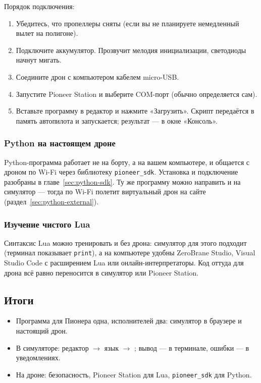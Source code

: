 Порядок подключения:
\begin{enumerate}
    \item Убедитесь, что пропеллеры сняты (если вы не планируете немедленный вылет на полигоне).
    \item Подключите аккумулятор. Прозвучит мелодия инициализации, светодиоды начнут мигать.
    \item Соедините дрон с компьютером кабелем micro-USB.
    \item Запустите Pioneer Station и выберите COM-порт (обычно определяется сам).
    \item Вставьте программу в редактор и нажмите «Загрузить». Скрипт передаётся в память автопилота и запускается; результат --- в окне «Консоль».
\end{enumerate}

\subsubsection{Python на настоящем дроне}

Python-программа работает не на борту, а на вашем компьютере, и общается с дроном по Wi-Fi через библиотеку \texttt{pioneer\_sdk}. Установка и подключение разобраны в главе~\ref{sec:python-sdk}. Ту же программу можно направить и на симулятор --- тогда по Wi-Fi полетит виртуальный дрон на сайте (раздел~\ref{sec:python-external}).

\subsubsection{Изучение чистого Lua}

Синтаксис Lua можно тренировать и без дрона: симулятор для этого подходит (терминал показывает \texttt{print}), а на компьютере удобны ZeroBrane Studio, Visual Studio Code с расширением Lua или онлайн-интерпретаторы. Код оттуда для дрона всё равно переносится в симулятор или Pioneer Station.

\subsection*{Итоги}
\begin{itemize}
    \item Программа для Пионера одна, исполнителей два: симулятор в браузере и настоящий дрон.
    \item В симуляторе: редактор $\to$ язык $\to$ ; вывод --- в терминале, ошибки --- в уведомлениях.
    \item На дроне: безопасность, Pioneer Station для Lua, \texttt{pioneer\_sdk} для Python.
\end{itemize}
